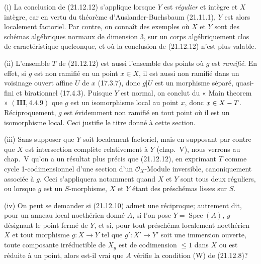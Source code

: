 \begin{remarks}[21.12.14]
\label{IV.21.12.14}
(i) La conclusion de (21.12.12) s'applique lorsque $Y$ est \emph{régulier} et intègre et $X$
intègre, car en vertu du théorème d'Auslander-Buchsbaum (21.11.1), $Y$ est alors
localement factoriel. Par contre, on connaît des exemples où $X$ et $Y$ sont des schémas
algébriques normaux de dimension $3$, sur un corps algébriquement clos de
caractéristique quelconque, et où la conclusion de (21.12.12) n'est plus valable.

(ii) L'ensemble $T$ de (21.12.12) est aussi l'ensemble des points où $g$ est
\emph{ramifié}. En effet, si $g$ est non ramifié en un point $x\in X$, il est aussi non
ramifié dans un voisinage ouvert affine $U$ de $x$ (17.3.7), donc $g|U$ est un morphisme
séparé, quasi-fini et birationnel (17.4.3). Puisque $Y$ est normal, on conclut du « Main
theorem » $(\mathbf{III}, 4.4.9)$ que $g$ est un isomorphisme local au point $x$, donc
$x\in X- T$. Réciproquement, $g$ est évidemment non ramifié en tout point où il est un
isomorphisme local. Ceci justifie le titre donné à cette section.

(iii) Sans supposer que $Y$ soit localement factoriel, mais en supposant par contre que
$X$ est intersection complète relativement à $Y$ (chap.~V), nous verrons au chap.~V
qu'on a un résultat plus précis que (21.12.12), en exprimant $T$ comme cycle
1-codimensionnel d'une section d'un $\mathcal O_X$-Module inversible, canoniquement
associée à $g$. Ceci s'appliquera notamment quand $X$ et $Y$ sont tous deux réguliers,
ou lorsque $g$ est un $S$-morphisme, $X$ et $Y$ étant des préschémas lisses sur $S$.

(iv) On peut se demander si (21.12.10) admet une réciproque; autrement dit, pour un
anneau local noethérien donné $A$, si l'on pose $Y=\operatorname{Spec}(A)$, $y$
désignant le point fermé de $Y$, et si, pour tout préschéma localement noethérien $X$ et
tout morphisme $g:X\to Y$ tel que $g':X'\to Y'$ soit une immersion ouverte, toute
composante irréductible de $X_y$ est de codimension $\leq1$ dans $X$ ou est réduite à
un point, alors est-il vrai que $A$ vérifie la condition (W) de (21.12.8)?


\end{remarks}
